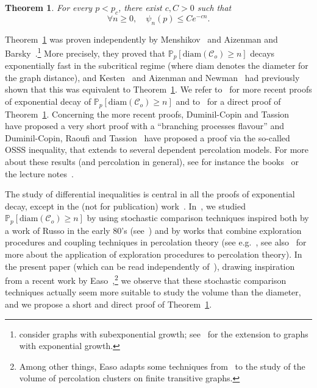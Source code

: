 \documentclass[10pt]{amsart}
\newtheorem{theo}{Theorem}[section]
\theoremstyle{definition}\newtheorem{defi}[theo]{Definition}\newtheorem{rema}[theo]{Remark}\newtheorem{exam}[theo]{Example}\newtheorem{exem}[theo]{Example}\newtheorem{nota}[theo]{Notation}
\newcommand{\Pro}{\mathbb{P}}
\newcommand{\calC}{\mathcal{C}}
\newcommand{\diam}{\mathrm{diam}}
\let\oldforall\forall
\renewcommand*{\forall}{\mathrel{\oldforall}}
\begin{document}
\begin{theo}\label{thm:exp'}
For every $p<p_c$, there exist $c,C>0$ such that
\[
\forall n \ge 0, \quad \psi_n(p) \le Ce^{-cn}.
\]
\end{theo}


Theorem~\ref{thm:exp'} was proven independently by Menshikov~\cite{Men86} and Aizenman and Barsky~\cite{AB87}.\footnote{\cite{AB87,Men86} consider graphs with subexponential growth; see~\cite{AV08} for the extension to graphs with exponential growth.} More precisely, they proved that $\Pro_p[\diam(\calC_o)\ge n]$ decays exponentially fast in the subcritical regime (where $\diam$ denotes the diameter for the graph distance), and Kesten~\cite{Kes81} and Aizenman and Newman~\cite{AN84} had previously shown that this was equivalent to Theorem~\ref{thm:exp'}. We refer to~\cite{DT16,DT17,DRT19,Van22} for more recent proofs of exponential decay of $\Pro_p[\diam(\calC_o)\ge n]$ and to~\cite{Hut20} for a direct proof of Theorem~\ref{thm:exp'}. Concerning the more recent proofs, Duminil-Copin and Tassion~\cite{DT16,DT17} have proposed a very short proof with a ``branching processes flavour'' and Duminil-Copin, Raoufi and Tassion~\cite{DRT19} have proposed a proof via the so-called OSSS inequality, that extends to several dependent percolation models. For more about these results (and percolation in general), see for instance the books~\cite{Gri99,BR06} or the lecture notes~\cite{Dum17}.



The study of differential inequalities is central in all the proofs of exponential decay, except in the (not for publication) work~\cite{Van22}. In~\cite{Van22}, we studied $\Pro_p[\diam(\calC_o)\ge n]$ by using stochastic comparison techniques inspired both by a work of Russo in the early 80's (see~\cite[Section~3]{Rus82}) and by works that combine exploration procedures and coupling techniques in percolation theory (see e.g.~\cite{DM22}, see also~\cite{GS14} for more about the application of exploration procedures to percolation theory). In the present paper (which can be read independently of~\cite{Van22}), drawing inspiration from a recent work by Easo~\cite{Eas22},\footnote{Among other things, Easo adapts some techniques from~\cite{Van22} to the study of the volume of percolation clusters on finite transitive graphs.} we observe that these stochastic comparison techniques actually seem more suitable to study the volume than the diameter, and we propose a short and direct proof of Theorem~\ref{thm:exp'}.
\end{document}
